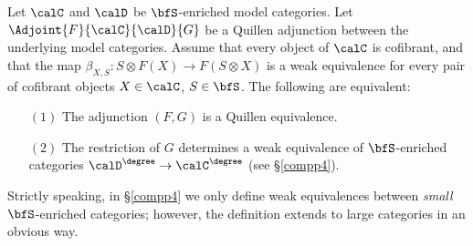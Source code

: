 \begin{proposition}\label{weakcompatequiv}
Let $\calC$ and $\calD$ be $\bfS$-enriched model categories. Let
$\Adjoint{F}{\calC}{\calD}{G}$ be a Quillen adjunction between the underlying model categories.
Assume that every object of $\calC$ is cofibrant,
and that the map $\beta_{X,S}: S \otimes F(X) \rightarrow F(S \otimes X)$ is a weak equivalence for every pair of cofibrant objects $X \in \calC$, $S \in \bfS$. The following are equivalent:
\begin{itemize}
\item[$(1)$] The adjunction $(F,G)$ is a Quillen equivalence.
\item[$(2)$] The restriction of $G$ determines a weak equivalence of $\bfS$-enriched categories
$\calD^{\degree} \rightarrow \calC^{\degree}$ (see \S \ref{compp4}).
\end{itemize}
\end{proposition}

\begin{remark}
Strictly speaking, in \S \ref{compp4} we only define weak equivalences between {\em small} $\bfS$-enriched categories; however, the definition extends to large categories in an obvious way.
\end{remark}

